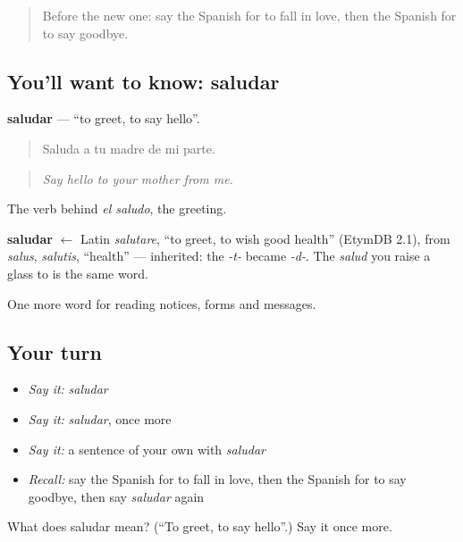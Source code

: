 \label{lesson:ES-C488-saludar}



\begin{quote}
Before the new one: say the Spanish for to fall in love, then the Spanish for to say goodbye.
\end{quote}

\subsection*{You'll want to know: saludar}
\textbf{saludar} — \textquotedblleft{}to greet, to say hello\textquotedblright{}.

\begin{quote}
Saluda a tu madre de mi parte.
\end{quote}

\begin{quote}
\emph{Say hello to your mother from me.}
\end{quote}

The verb behind \emph{el saludo}, the greeting.

\begin{cousinweb}
\textbf{saludar} $\leftarrow$ Latin \emph{salutare}, \textquotedblleft{}to greet, to wish good health\textquotedblright{} (EtymDB 2.1), from \emph{salus}, \emph{salutis}, \textquotedblleft{}health\textquotedblright{} — inherited: the \emph{-t-} became \emph{-d-}. The \emph{salud} you raise a glass to is the same word.
\end{cousinweb}

\begin{grammarlens}[title={What you've built}]
One more word for reading notices, forms and messages.
\end{grammarlens}

\subsection*{Your turn}
\begin{itemize}
\raggedright
  \item \emph{Say it:} \emph{saludar}
  \item \emph{Say it:} \emph{saludar}, once more
  \item \emph{Say it:} a sentence of your own with \emph{saludar}
  \item \emph{Recall:} say the Spanish for to fall in love, then the Spanish for to say goodbye, then say \emph{saludar} again
\end{itemize}

\begin{tcolorbox}[breakable,colback=teal!4,colframe=teal!35!black,title={Before you move on}]
What does saludar mean? (\textquotedblleft{}To greet, to say hello\textquotedblright{}.) Say it once more.
\end{tcolorbox}
